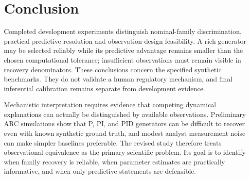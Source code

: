 \section{Conclusion}

Completed development experiments distinguish nominal-family discrimination, practical predictive resolution and observation-design feasibility. A rich generator may be selected reliably while its predictive advantage remains smaller than the chosen computational tolerance; insufficient observations must remain visible in recovery denominators. These conclusions concern the specified synthetic benchmarks. They do not validate a human regulatory mechanism, and final inferential calibration remains separate from development evidence.

Mechanistic interpretation requires evidence that competing dynamical explanations can actually be distinguished by available observations. Preliminary ARC simulations show that P, PI, and PID generators can be difficult to recover even with known synthetic ground truth, and modest analyst measurement noise can make simpler baselines preferable. The revised study therefore treats observational equivalence as the primary scientific problem. Its goal is to identify when family recovery is reliable, when parameter estimates are practically informative, and when only predictive statements are defensible.
